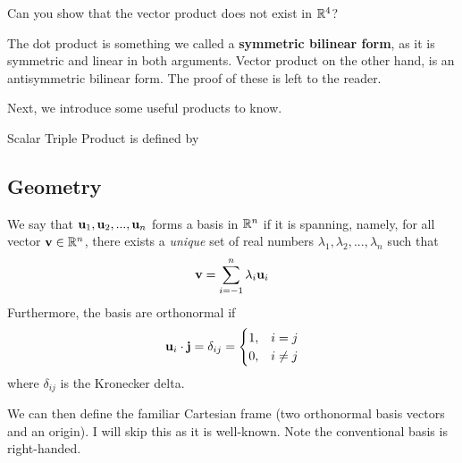 \documentclass[11pt]{article}
\begin{document}
\begin{problem}
  Can you show that the vector product does not exist in \(\R^4\)?
\end{problem}
\begin{solution}
\end{solution}

The dot product is something we called a \textbf{symmetric bilinear form}, as it is symmetric and linear in both arguments. Vector product on the other hand, is an antisymmetric bilinear form. The proof of these is left to the reader.

Next, we introduce some useful products to know.

\begin{definition}
  Scalar Triple Product is defined by   

\end{definition}

\subsection{Geometry}
\begin{definition}[Basis]
  We say that \(\bf{u}_1,\bf{u}_2,...,\bf{u}_n\) forms a basis in \(\R^n\) if it is spanning, namely, for all vector \(\bf{v} \in \R^n\), there exists a \emph{unique} set of real numbers \(\lambda_1, \lambda_2,..., \lambda_n\) such that
  \begin{equation*}
    \bf{v} = \sum_{i=-1}^n \lambda_i\bf{u}_i
  \end{equation*}
  Furthermore, the basis are orthonormal if 
  \begin{equation*}
    \bf{u}_i \cdot \bf{j} = \delta_{ij} = 
    \begin{cases}
      1, & i = j \\ 0, & i\neq j
    \end{cases}
  \end{equation*}
  where \(\delta_{ij}\) is the Kronecker delta.
\end{definition}

We can then define the familiar Cartesian frame (two orthonormal basis vectors and an origin). I will skip this as it is well-known. Note the conventional basis is right-handed.

\begin{definition}
\end{definition}
\end{document}
